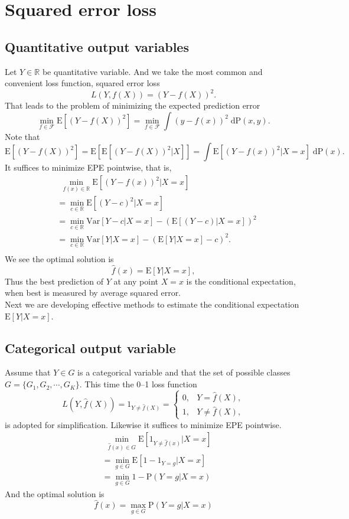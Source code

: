 \documentclass{report}
\theoremstyle{nonumberplain}
\begin{document}
\section{Squared error loss}
\subsection{Quantitative output variables}
Let $Y\in\mathbb{R}$ be quantitative variable. And we take the most
common and convenient loss function, squared error loss
\[
L(Y,f(X))=(Y-f(X))^2.
\]That leads to the problem of minimizing the expected prediction error
\[
\min_{f\in\mathcal{F}}\mathrm{E}[(Y-f(X))^2]=\min_{f\in\mathcal{F}}\int (y-f(x))^2\;\mathrm{dP}(x,y).
\]
Note that
\[\mathrm{E}[(Y-f(X))^2]=\mathrm{E}[\mathrm{E}[(Y-f(X))^2|X]]=\int\mathrm{E}[(Y-f(x))^2|X=x]\;\mathrm{dP}(x).\]
It suffices to minimize EPE pointwise, that is, 
\begin{align*}
&\ \ \min_{f(x)\in\mathbb{R}}\mathrm{E}[(Y-f(x))^2|X=x]\\
&=\min_{c\in\mathbb{R}}\mathrm{E}[(Y-c)^2|X=x]\\
&=\min_{c\in\mathbb{R}}\mathrm{Var}[Y-c|X=x]-(\mathrm{E}[(Y-c)|X=x])^2\\
&=\min_{c\in\mathbb{R}}\mathrm{Var}[Y|X=x]-(\mathrm{E}[Y|X=x]-c)^2.\\
\end{align*}
We see the optimal solution is
\[
\hat{f}(x) = \mathrm{E}[Y|X=x],
\]
Thus the best prediction of $Y$ at any point $X = x$ is the conditional expectation, when best is measured by average squared error. \\
Next we are developing effective methods to estimate the conditional expectation $\mathrm{E}[Y|X=x]$.
\subsection{Categorical output variable}
Assume that $Y\in G$ is a categorical variable and that the set of possible classes $G=\{G_1,G_2,\cdots,G_K\}$. This time the 0–1 loss function 
\[
L(Y,\hat{f}(X))=1_{Y\ne\hat{f}(X)}=
\begin{cases}
0,&Y=\hat{f}(X),\\
1,&Y\ne\hat{f}(X),
\end{cases}
\]
is adopted for simplification. Likewise it suffices to minimize EPE pointwise.
\begin{align*}
&\ \ \min_{\hat{f}(x)\in G}\mathrm{E}[1_{Y\ne\hat{f}(x)}|X=x]\\
&=\min_{g\in G}\mathrm{E}[1-1_{Y=g}|X=x]\\
&=\min_{g\in G}1-\mathrm{P}(Y=g|X=x)
\end{align*}
And the optimal solution is
\[
\hat{f}(x)=\max_{g\in G} \mathrm{P}(Y=g|X=x)
\]
\end{document}
